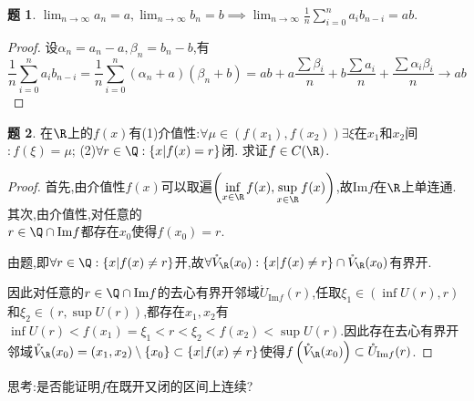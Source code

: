 \documentclass{article}
\theoremstyle{definition}
\newtheorem{exercise}{题}[section]
\begin{document}
\begin{exercise}
    $\lim_{n\to \infty}a_n=a,\lim_{n\to \infty}b_n=b\implies \lim_{n\to \infty}\frac{1}{n}\sum_{i=0}^n a_ib_{n-i}=ab$.
\end{exercise}
\begin{proof}
    设\(\alpha_n=a_n-a,\beta_n=b_n-b\),有\[\frac{1}{n}\sum_{i=0}^n a_ib_{n-i}=\frac{1}{n}\sum_{i=0}^n (\alpha_n+a)(\beta_n+b)=ab+a\frac{\sum \beta_i}{n}+b\frac{\sum a_i}{n}+\frac{\sum \alpha_i\beta_i}{n}\to ab\]
\end{proof}

\begin{exercise}
    在$\R$上的$f(x)$有(1)介值性:$\forall \mu\in(f(x_1),f(x_2)) \exists \xi$在$x_1$和$x_2$间$: f(\xi)=\mu$; (2)${\forall r\in \Q:\{x|f(x)=r\}}$闭. 求证$f\in C(\R)$.
\end{exercise}
\begin{proof}
    首先,由介值性$f(x)$可以取遍$\left( \inf\limits_{x\in \R} f(x),\sup\limits_{x\in \R} f(x) \right)$,故$\mathrm{Im} f$在$\R$上单连通.其次,由介值性,对任意的\\ $r\in {\Q\cap \mathrm{Im} f}$都存在$x_0$使得$f(x_0)=r$.

    由题,即$\forall r\in \Q:\{x|f(x)\neq r\}$开,故$\forall\mathring{V}_{\R}(x_0): \{x|f(x)\neq r\}\cap \mathring{V}_{\R}(x_0)$有界开.%
    
    因此对任意的$r\in {\Q\cap \mathrm{Im} f}$的去心有界开邻域$\mathring{U}_{\mathrm{Im} f}(r)$,任取$\xi_1\in (\inf U(r),r)$和$\xi_2\in (r,\sup U(r))$,都存在$x_1,x_2$有${\inf U(r)<f(x_1)=\xi_1<r<\xi_2<f(x_2)<\sup U(r)}$.因此存在去心有界开邻域$\mathring{V}_{\R}(x_0)=\\ (x_1,x_2)\setminus\{x_0\}\subset \{x|f(x)\neq r\}$使得$f\left( \mathring{V}_{\R}(x_0) \right)\subset \mathring{U}_{\mathrm{Im} f}(r)$.

\end{proof}
思考:是否能证明$f$在既开又闭的区间上连续?
\end{document}
